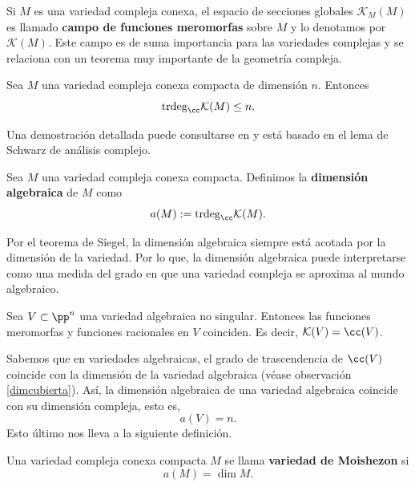 Si $M$ es una variedad compleja conexa, el espacio de secciones globales $\mathcal{K}_{M}(M)$ es llamado \textbf{campo de funciones meromorfas} sobre $M$ y lo denotamos por $\mathcal{K}(M)$. Este campo es de suma importancia para las variedades complejas y se relaciona con un teorema muy importante de la geometría compleja.

\begin{theorem}[Siegel]
	Sea $M$ una variedad compleja conexa compacta de dimensión $n$. Entonces
	\begin{equation*}
		\mathrm{trdeg}_\cc\mathcal{K}(M)\leq n.
	\end{equation*}
\end{theorem}
Una demostración detallada puede consultarse en \parencite[Teo. 4.23]{carlosga} y está basado en el lema de Schwarz de análisis complejo.

\begin{definition}
	Sea $M$ una variedad compleja conexa compacta. Definimos la \textbf{dimensión algebraica} de $M$ como
	\begin{equation*}
		a(M):=\mathrm{trdeg}_\cc\mathcal{K}(M).
	\end{equation*}
\end{definition}

Por el teorema de Siegel, la dimensión algebraica siempre está acotada por la dimensión de la variedad. Por lo que, la dimensión algebraica puede interpretarse como una medida del grado en que una variedad compleja se aproxima al mundo algebraico.

\begin{theorem}\parencite[Chap. VIII, Sec. 3.1, Theo. 1]{shafarevich2016basic}
	Sea $V\subset \pp^n$ una variedad algebraica no singular. Entonces las funciones meromorfas y funciones racionales en $V$ coinciden. Es decir, $\mathcal{K}(V)=\cc(V)$.
\end{theorem}

Sabemos que en variedades algebraicas, el grado de trascendencia de $\cc(V)$ coincide con la dimensión de la variedad algebraica (véase observación \ref{dimcubierta}). Así, la dimensión algebraica de una variedad algebraica coincide con su dimensión compleja, esto es,
\begin{equation*}
	a(V)=n.
\end{equation*}
Esto último nos lleva a la siguiente definición.

\begin{definition}
	Una variedad compleja conexa compacta $M$ se llama \textbf{variedad de Moishezon} si
	\begin{equation*}
		a(M)=\dim M.
	\end{equation*}
\end{definition}

